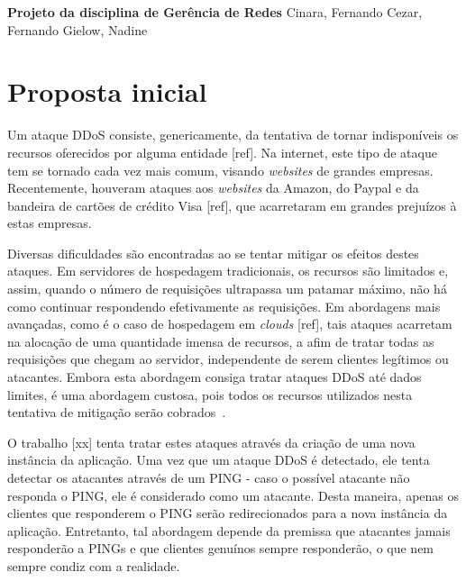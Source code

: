 \documentclass[a4paper, 11pt]{article}
\begin{document}
{
\begin{center}
{\LARGE \textbf{Projeto da disciplina de Gerência de Redes}}
\vskip 0.5cm
{\Large Cinara, Fernando Cezar, Fernando Gielow, Nadine}
\end{center}
}

\section{Proposta inicial}

Um ataque DDoS consiste, genericamente, da tentativa de tornar indisponíveis os recursos oferecidos por alguma entidade [ref]. Na internet, este tipo de ataque tem se tornado cada vez mais comum, visando \emph{websites} de grandes empresas. Recentemente, houveram ataques aos \emph{websites} da Amazon, do Paypal e da bandeira de cartões de crédito Visa [ref], que acarretaram em grandes prejuízos à estas empresas.

Diversas dificuldades são encontradas ao se tentar mitigar os efeitos destes ataques. Em servidores de hospedagem tradicionais, os recursos são limitados e, assim, quando o número de requisições ultrapassa um patamar máximo, não há como continuar respondendo efetivamente as requisições. Em abordagens mais avançadas, como é o caso de hospedagem em \emph{clouds} [ref], tais ataques acarretam na alocação de uma quantidade imensa de recursos, a afim de tratar todas as requisições que chegam ao servidor, independente de serem clientes legítimos ou atacantes. Embora esta abordagem consiga tratar ataques DDoS até dados limites, é uma abordagem custosa, pois todos os recursos utilizados nesta tentativa de mitigação serão cobrados~\cite{Khor:2009p24701}.

O trabalho [xx] tenta tratar estes ataques através da criação de uma nova instância da aplicação. Uma vez que um ataque DDoS é detectado, ele tenta detectar os atacantes através de um PING - caso o possível atacante não responda o PING, ele é considerado como um atacante. Desta maneira, apenas os clientes que responderem o PING serão redirecionados para a nova instância da aplicação. Entretanto, tal abordagem depende da premissa que atacantes jamais responderão a PINGs e que clientes genuínos sempre responderão, o que nem sempre condiz com a realidade. 
\end{document}
